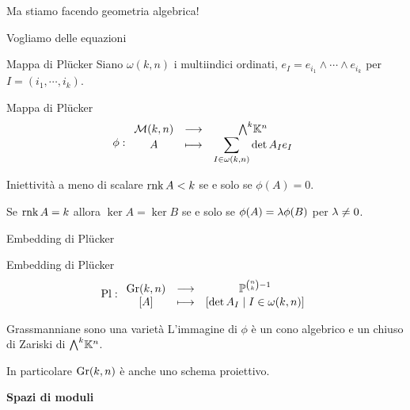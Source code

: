 \documentclass[a4paper]{beamer}
\begin{document}
\begin{frame}{}
\begin{center}
{\huge Ma stiamo facendo geometria algebrica!} 
\pause
\bigskip

{\Large Vogliamo delle equazioni}
\end{center}
\end{frame}

\begin{frame}{Mappa di Pl\"ucker}
Siano $\omega(k,n)$ i multiindici ordinati, $e_I=e_{i_1}\wedge\cdots\wedge e_{i_k}$ per $I=(i_1,\cdots, i_k)$.
\begin{block}{Mappa di Pl\"ucker}
\[\phi:\funcDef{\Mc(k,n)}{\bw\K^n}{A}{\displaystyle\sum_{I\in \omega(k,n)}\det A_I e_I}\]
\end{block}

\pause
\begin{alertblock}{Iniettivit\`a a meno di scalare}
$\mathrm{rnk}\, A<k$ se e solo se $\phi(A)=0$. 

Se $\mathrm{rnk}\, A=k$ allora $\ker A=\ker B$ se e solo se $\phi(A)=\lambda \phi(B)$ per $\lambda\neq 0$.
\end{alertblock}
\end{frame}

\begin{frame}{Embedding di Pl\"ucker}
\begin{block}{Embedding di Pl\"ucker}
\[\mathrm{Pl}:\begin{array}{ccc} {\mathrm{Gr}(k,n)} & \longrightarrow & {\mathbb{P}^{\binom nk-1}}\\ {[A]} & \longmapsto & {[\det A_I\mid I\in\omega(k,n)]} \end{array}\]
\end{block}
\pause
\begin{alertblock}{Grassmanniane sono una variet\`a}
L'immagine di $\phi$ \`e un cono algebrico e un chiuso di Zariski di $\bw \K^n$.
\end{alertblock}
\pause
In particolare $\mathrm{Gr}(k,n)$ \`e anche uno schema proiettivo.
\end{frame}







\begin{frame}{}
\begin{center}
{\huge \textbf{Spazi di moduli}}
\end{center}
\end{frame}
\end{document}
